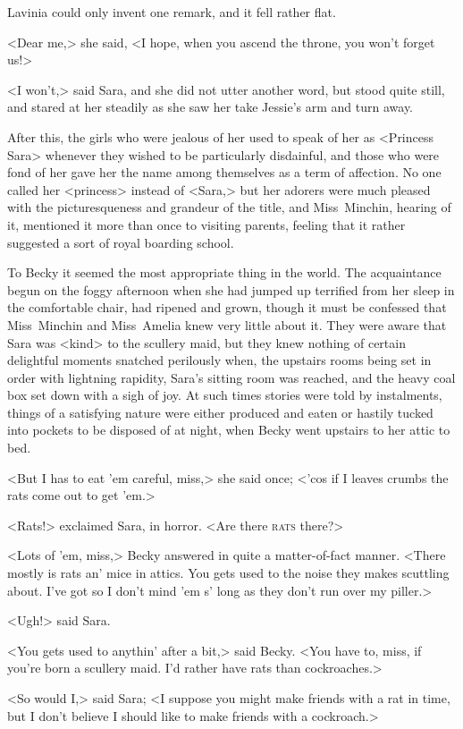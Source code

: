 Lavinia could only invent one remark, and it fell rather flat.

<Dear me,> she said, <I hope, when you ascend the throne, you won't forget us!>

<I won't,> said Sara, and she did not utter another word, but stood quite still, and stared at her steadily as she saw her take Jessie's arm and turn away.

After this, the girls who were jealous of her used to speak of her as <Princess Sara> whenever they wished to be particularly disdainful, and those who were fond of her gave her the name among themselves as a term of affection. No one called her <princess> instead of <Sara,> but her adorers were much pleased with the picturesqueness and grandeur of the title, and Miss~Minchin, hearing of it, mentioned it more than once to visiting parents, feeling that it rather suggested a sort of royal boarding school.

To Becky it seemed the most appropriate thing in the world. The acquaintance begun on the foggy afternoon when she had jumped up terrified from her sleep in the comfortable chair, had ripened and grown, though it must be confessed that Miss~Minchin and Miss~Amelia knew very little about it. They were aware that Sara was <kind> to the scullery maid, but they knew nothing of certain delightful moments snatched perilously when, the upstairs rooms being set in order with lightning rapidity, Sara's sitting room was reached, and the heavy coal box set down with a sigh of joy. At such times stories were told by instalments, things of a satisfying nature were either produced and eaten or hastily tucked into pockets to be disposed of at night, when Becky went upstairs to her attic to bed.

<But I has to eat 'em careful, miss,> she said once; <'cos if I leaves crumbs the rats come out to get 'em.>

<Rats!> exclaimed Sara, in horror. <Are there \textsc{rats} there?>

<Lots of 'em, miss,> Becky answered in quite a matter-of-fact manner. <There mostly is rats an' mice in attics. You gets used to the noise they makes scuttling about. I've got so I don't mind 'em s' long as they don't run over my piller.>

<Ugh!> said Sara.

<You gets used to anythin' after a bit,> said Becky. <You have to, miss, if you're born a scullery maid. I'd rather have rats than cockroaches.>

<So would I,> said Sara; <I suppose you might make friends with a rat in time, but I don't believe I should like to make friends with a cockroach.>

